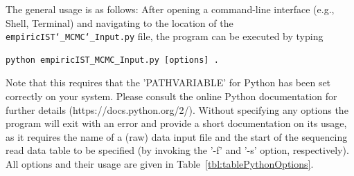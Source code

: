 \documentclass[12pt,a4paper]{scrartcl}
\begin{document}
The general usage is as follows: After opening a command-line interface (e.g., Shell, Terminal) and navigating to the location of the \texttt{empiricIST\char`_MCMC\char`_Input.py} file, the program can be executed by typing
\begin{lstlisting}
python empiricIST_MCMC_Input.py [options] .
\end{lstlisting}

Note that this requires that the 'PATHVARIABLE' for Python has been set correctly on your system. Please consult the online Python documentation for further details (https://docs.python.org/2/). Without specifying any options the program will exit with an error and provide a short documentation on its usage, as it requires the name of a (raw) data input file and the start of the sequencing read data table to be specified (by invoking the '-f' and '-s' option, respectively). All options and their usage are given in Table~\ref{tbl:tablePythonOptions}.
\end{document}
